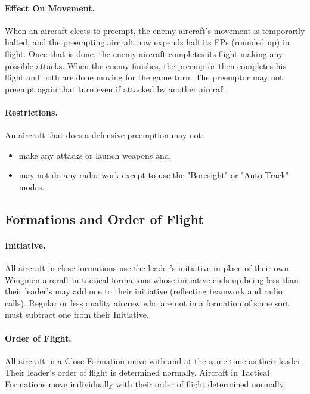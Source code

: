 \paragraph{Effect On Movement.} When an aircraft elects to preempt, the enemy aircraft's movement is temporarily halted, and the preempting aircraft now expends half its FPs (rounded up) in flight. Once that is done, the enemy aircraft completes its flight making any possible attacks. When the enemy finishes, the preemptor then completes his flight and both are done moving for the game turn. The preemptor may not preempt again that turn even if attacked by another aircraft. 

\paragraph{Restrictions.} An aircraft that does a defensive preemption may not:  

\begin{itemize}
    \item make any attacks or launch weapons and,
    \item may not do any radar work except to use the "Boresight" or "Auto-Track" modes.
\end{itemize}	


\begin{advancedrules}

\section{Formations and Order of Flight}

\paragraph{Initiative.} All aircraft in close formations use the leader's initiative in place of their own. Wingmen aircraft in tactical formations whose initiative ends up being less than their leader's may add one to their initiative (reflecting teamwork and radio calls). Regular or less quality aircrew who are not in a formation of some sort must subtract one from their Initiative.

\paragraph{Order of Flight.} All aircraft in a Close Formation move with and at the same time as their leader. Their leader's order of flight is determined normally. Aircraft in Tactical Formations move individually with their order of flight determined normally.

\end{advancedrules}
